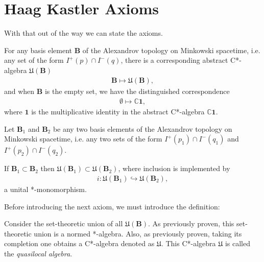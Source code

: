\section{Haag Kastler Axioms}\label{sctn:haag-kastler-axioms}
With that out of the way we can state the axioms.

\begin{axiom}
    \label{axm:local-algebras}
    For any basis element $\mathbf{B}$ of the Alexandrov topology on Minkowski spacetime, i.e. any set of the form $I^+(p) \cap I^-(q)$, there is a corresponding abstract C*-algebra $\mathfrak{U}(\mathbf{B})$
    \begin{align}
        \mathbf{B} \longmapsto \mathfrak{U}(\mathbf{B}),
    \end{align}
    and when $\mathbf{B}$ is the empty set, we have the distinguished correspondence
    \begin{align}
        \emptyset \longmapsto \mathbb{C} \mathbf{1},
    \end{align}
    where $\mathbf{1}$ is the multiplicative identity in the abstract C*-algebra $\mathbb{C} \mathbf{1}$.
\end{axiom}

\begin{axiom}[Isotony]
    \label{axm:isotony}
    Let $\mathbf{B}_1$ and $\mathbf{B}_2$ be any two basis elements of the Alexandrov topology on Minkowski spacetime, i.e. any two sets of the form $I^+(p_1) \cap I^-(q_1)$ and $I^+(p_2) \cap I^-(q_2)$.
    
    If $\mathbf{B}_1 \subset \mathbf{B}_2$ then $\mathfrak{U}(\mathbf{B}_1) \subset \mathfrak{U}(\mathbf{B}_2)$, where inclusion is implemented by
    \begin{align}
        i : \mathfrak{U}(\mathbf{B}_1) \hookrightarrow \mathfrak{U}(\mathbf{B}_2),
    \end{align}
    a unital *-monomorphism.
\end{axiom}

Before introducing the next axiom, we must introduce the definition:

\begin{definition}
    \label{def:quasilocal-algebra}
    Consider the set-theoretic union of all $\mathfrak{U}(\mathbf{B})$. As previously proven, this set-theoretic union is a normed *-algebra. Also, as previously proven, taking its completion one obtains a C*-algebra denoted as $\mathfrak{U}$. This C*-algebra $\mathfrak{U}$ is called the \textit{quasilocal algebra}.
\end{definition}

